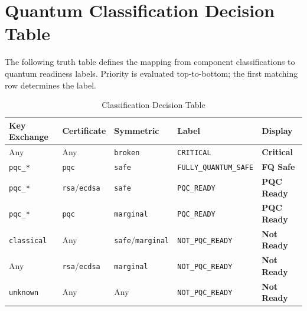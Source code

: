 \section{Quantum Classification Decision Table}
\label{sec:classification_table}

The following truth table defines the mapping from component classifications
to quantum readiness labels. Priority is evaluated top-to-bottom; the first
matching row determines the label.

\begin{table}[H]
  \centering
  \caption{Classification Decision Table}
  \label{tab:classification}
  \begin{tabularx}{\textwidth}{C{2.2cm} C{2.2cm} C{2.4cm} L{4.2cm} L{3.6cm}}
    \toprule
    \textbf{Key Exchange} & \textbf{Certificate} & \textbf{Symmetric} &
    \textbf{Label} & \textbf{Display} \\
    \midrule
    Any & Any & \texttt{broken} &
      {\footnotesize\texttt{CRITICAL}} &
      \textcolor{critical}{\textbf{\critsym{} Critical}} \\
    \addlinespace
    \texttt{pqc\_*} & \texttt{pqc} & \texttt{safe} &
      {\footnotesize\texttt{FULLY\_QUANTUM\_SAFE}} &
      \textcolor{safe}{\textbf{\fqssym{} FQ Safe}} \\
    \addlinespace
    \texttt{pqc\_*} & \texttt{rsa}/\texttt{ecdsa} & \texttt{safe} &
      {\footnotesize\texttt{PQC\_READY}} &
      \textcolor{pqcready}{\textbf{\pqcsym{} PQC Ready}} \\
    \addlinespace
    \texttt{pqc\_*} & \texttt{pqc} & \texttt{marginal} &
      {\footnotesize\texttt{PQC\_READY}} &
      \textcolor{pqcready}{\textbf{\pqcsym{} PQC Ready}} \\
    \addlinespace
    \texttt{classical} & Any & \texttt{safe}/\texttt{marginal} &
      {\footnotesize\texttt{NOT\_PQC\_READY}} &
      \textcolor{notpqc}{\textbf{\notpqcsym{} Not Ready}} \\
    \addlinespace
    Any & \texttt{rsa}/\texttt{ecdsa} & \texttt{marginal} &
      {\footnotesize\texttt{NOT\_PQC\_READY}} &
      \textcolor{notpqc}{\textbf{\notpqcsym{} Not Ready}} \\
    \addlinespace
    \texttt{unknown} & Any & Any &
      {\footnotesize\texttt{NOT\_PQC\_READY}} &
      \textcolor{notpqc}{\textbf{\notpqcsym{} Not Ready}} \\
    \bottomrule
  \end{tabularx}
\end{table}


